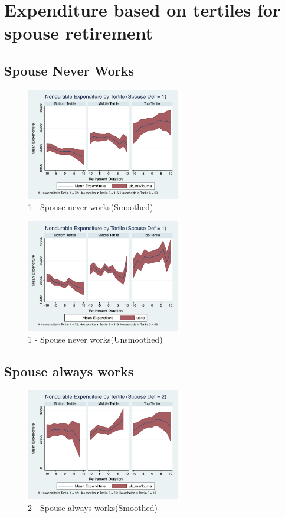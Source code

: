 \documentclass[11pt,onecolumn]{article}
\begin{document}
\clearpage
\section{Expenditure based on tertiles for spouse retirement}

\subsection{Spouse Never Works}

\begin{figure}[h]
	\caption{1 - Spouse never works(Smoothed)}
	\centering
	\includegraphics[width=0.6\textwidth]{../ConsumptionPostRetirement_by_SpouseDef/Smoothed/spouse_def_1.pdf}
\end{figure}

\begin{figure}[h]
	\caption{1 - Spouse never works(Unsmoothed)}
	\centering
	\includegraphics[width=0.6\textwidth]{../ConsumptionPostRetirement_by_SpouseDef/UnSmoothed/spouse_def_1.pdf}
\end{figure}
\clearpage


\subsection{Spouse always works}
\begin{figure}[h]
	\caption{2 - Spouse always works(Smoothed)}
	\centering
	\includegraphics[width=0.6\textwidth]{../ConsumptionPostRetirement_by_SpouseDef/Smoothed/spouse_def_2.pdf}
\end{figure}
\end{document}
